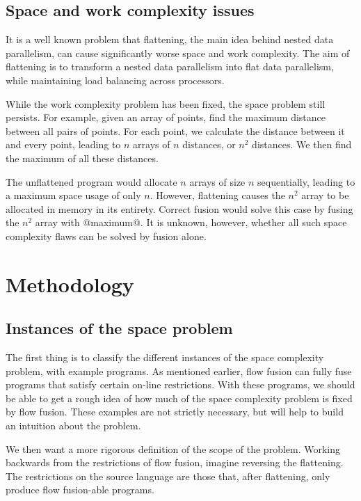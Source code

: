 \documentclass[12pt,a4paper]{article}
\begin{document}
\subsection{Space and work complexity issues}

It is a well known problem that flattening, the main idea behind nested data parallelism\cite{blelloch1995nesl}, can cause significantly worse space and work complexity\cite{lippmeier2012work,spoonhower2007semantic}.
The aim of flattening is to transform a nested data parallelism into flat data parallelism,
while maintaining load balancing across processors.

While the work complexity problem has been fixed\cite{lippmeier2012work}, the space problem still persists.
For example, given an array of points, find the maximum distance between all pairs of points.
For each point, we calculate the distance between it and every point, leading to $n$ arrays of $n$ distances, or $n^2$ distances.
We then find the maximum of all these distances.

The unflattened program would allocate $n$ arrays of size $n$ sequentially,
leading to a maximum space usage of only $n$.
However, flattening causes the $n^2$ array to be allocated in memory in its entirety.
Correct fusion would solve this case by fusing the $n^2$ array with @maximum@.
It is unknown, however, whether all such space complexity flaws can be solved by fusion alone.


\pagebreak
\section{Methodology}

\subsection{Instances of the space problem}
The first thing is to classify the different instances of the space complexity problem, with example programs.
As mentioned earlier, flow fusion can fully fuse programs that satisfy certain on-line restrictions\cite{lippmeier2013flow}.
With these programs, we should be able to get a rough idea of how much of the space complexity problem is fixed by flow fusion.
These examples are not strictly necessary, but will help to build an intuition about the problem.

We then want a more rigorous definition of the scope of the problem.
Working backwards from the restrictions of flow fusion,
imagine reversing the flattening. 
The restrictions on the source language are those that, after flattening, only produce flow fusion-able programs.
\end{document}
